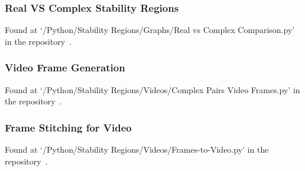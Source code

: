 \subsubsection{Real VS Complex Stability Regions}
Found at `/Python/Stability Regions/Graphs/Real vs Complex Comparison.py' in the repository~\cite{GitHub_Repo}.

\newpage
\subsubsection{Video Frame Generation}
Found at `/Python/Stability Regions/Videos/Complex Pairs Video Frames.py' in the repository~\cite{GitHub_Repo}.

\newpage
\subsubsection{Frame Stitching for Video}
Found at `/Python/Stability Regions/Videos/Frames-to-Video.py' in the repository~\cite{GitHub_Repo}.

\newpage
